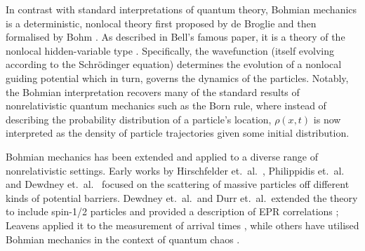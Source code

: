 \documentclass[12pt,prx,
,nofootinbib
,floatfix
,superscriptaddress
]{revtex4-2}
\begin{document}
In contrast with standard interpretations of quantum theory, Bohmian mechanics is a deterministic, nonlocal theory first proposed by de Broglie \cite{debroglie:jpa-00205292} and then formalised by Bohm \cite{bohmPhysRev.85.166,bohm2006undivided}. As described in Bell's famous paper, it is a theory of the nonlocal hidden-variable type \cite{EPRPhysRev.47.777,bellPhysicsPhysiqueFizika.1.195}. Specifically, the wavefunction (itself evolving according to the Schr\"odinger equation) determines the evolution of a nonlocal guiding potential which in turn, governs the dynamics of the particles. Notably, the Bohmian interpretation recovers many of the standard results of nonrelativistic quantum mechanics such as the Born rule, where instead of describing the probability distribution of a particle's location, $\rho(x,t)$ is now interpreted as the density of particle trajectories given some initial distribution.

Bohmian mechanics has been extended and applied to a diverse range of nonrelativistic settings. Early works by Hirschfelder et.\ al.\ \cite{hirschfelderdoi:10.1063/1.1681899}, Philippidis et.\ al.\ \cite{philippidis1979quantum} and Dewdney et.\ al.\ \cite{dewdney1982quantum} focused on the scattering of massive particles off different kinds of potential barriers. Dewdney et.\ al.\ and Durr et.\ al.\ extended the theory to include spin-1/2 particles and provided a description of EPR correlations \cite{dewdney1988spin,durr1996bohmian}; Leavens applied it to the measurement of arrival times \cite{leavensPhysRevA.58.840}, while others have utilised Bohmian mechanics in the context of quantum chaos \cite{durr1992quantum,FRISK1997139}. 
\end{document}
